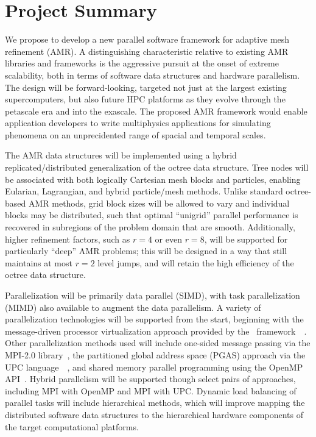 \documentclass[10pt,twocolumn]{article}
\begin{document}
\section{Project Summary}  \label{s:summary}

We propose to develop a new parallel software framework for adaptive
mesh refinement (AMR).  A distinguishing characteristic relative to
existing AMR libraries and frameworks is the aggressive pursuit at the
onset of extreme scalability, both in terms of software data
structures and hardware parallelism.  The design will be
forward-looking, targeted not just at the largest existing
supercomputers, but also future HPC platforms as they evolve through
the petascale era and into the exascale.  The proposed AMR framework
would enable application developers to write multiphysics applications
for simulating phenomena on an unprecidented range of spacial and
temporal scales.

The AMR data structures will be implemented using a hybrid
replicated/distributed generalization of the octree data structure.
Tree nodes will be associated with both logically Cartesian mesh
blocks and particles, enabling Eularian, Lagrangian, and hybrid
particle/mesh methods.  Unlike standard octree-based AMR methods, grid
block sizes will be allowed to vary and individual blocks may be
distributed, such that optimal ``unigrid'' parallel performance is
recovered in subregions of the problem domain that are smooth.
Additionally, higher refinement factors, such as $r=4$ or even $r=8$,
will be supported for particularly ``deep'' AMR problems; this will be
designed in a way that still maintains at most $r=2$ level jumps, and
will retain the high efficiency of the octree data structure.

Parallelization will be primarily data parallel (SIMD), with task
parallelization (MIMD) also available to augment the data parallelism.
A variety of parallelization technologies will be supported from the
start, beginning with the message-driven processor virtualization
approach provided by the \charm\
framework~\cite{KaBo07}~\cite{wwwcharm}.  Other parallelization
methods used will include one-sided message passing via the MPI-2.0
library~\cite{wwwmpi}, the partitioned global address space (PGAS)
approach via the UPC language~\cite{wwwupc}~\cite{upc}, and shared
memory parallel programming using the OpenMP API~\cite{wwwopenmp}.
Hybrid parallelism will be supported though select pairs of
approaches, including MPI with OpenMP and MPI with UPC.  Dynamic load
balancing of parallel tasks will include hierarchical methods, which
will improve mapping the distributed software data structures to the
hierarchical hardware components of the target computational
platforms.
\end{document}

